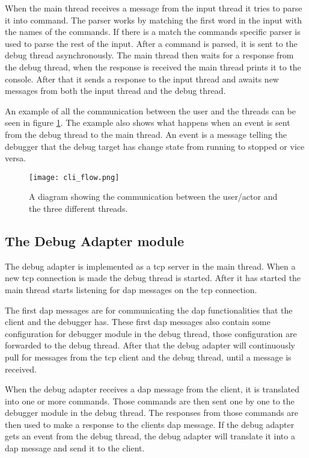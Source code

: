 When the main thread receives a message from the input thread it tries to parse it into command.
The parser works by matching the first word in the input with the names of the commands.
If there is a match the commands specific parser is used to parse the rest of the input.
After a command is parsed, it is sent to the debug thread asynchronously.
The main thread then waits for a response from the debug thread, when the response is received the main thread prints it to the console.
After that it sends a response to the input thread and awaits new messages from both the input thread and the debug thread.


An example of all the communication between the user and the threads can be seen in figure \ref{fig:cliflow}.
The example also shows what happens when an event is sent from the debug thread to the main thread.
An event is a message telling the debugger that the debug target has change state from running to stopped or vice versa.


\begin{figure}[h]
	\centering
	\texttt{[image: cli\_flow.png]}
	\caption{A diagram showing the communication between the user/actor and the three different threads.}
	\label{fig:cliflow}
\end{figure}




\subsection{The Debug Adapter module}


The debug adapter is implemented as a \gls{tcp} server in the main thread.
When a new \gls{tcp} connection is made the debug thread is started.
After it has started the main thread starts listening for \gls{dap} messages on the \gls{tcp} connection.


The first \gls{dap} messages are for communicating the \gls{dap} functionalities that the client and the debugger has.
These first \gls{dap} messages also contain some configuration for debugger module in the debug thread, those configuration are forwarded to the debug thread.
After that the debug adapter will continuously pull for messages from the \gls{tcp} client and the debug thread, until a message is received.


When the debug adapter receives a \gls{dap} message from the client, it is translated into one or more commands.
Those commands are then sent one by one to the debugger module in the debug thread.
The responses from those commands are then used to make a response to the clients \gls{dap} message.
If the debug adapter gets an event from the debug thread, the debug adapter will translate it into a \gls{dap} message and send it to the client.



